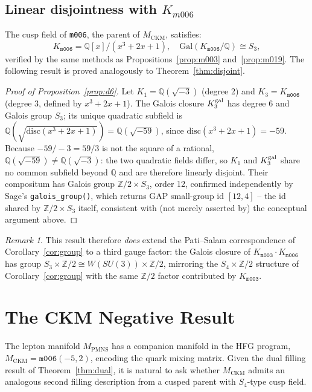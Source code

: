 \documentclass[11pt,a4paper]{article}
\theoremstyle{definition}
\theoremstyle{remark}
\newtheorem{remark}[theorem]{Remark}
\newcommand{\Z}{\mathbb{Z}}
\newcommand{\Q}{\mathbb{Q}}
\newcommand{\mfld}[1]{\texttt{#1}}
\newcommand{\Gal}{\mathrm{Gal}}
\newcommand{\disc}{\mathrm{disc}}
\begin{document}
\subsection{Linear disjointness with $K_{m006}$}

The cusp field of \mfld{m006}, the parent of $M_{\mathrm{CKM}}$,
satisfies:
\[
K_{\mfld{m006}} = \Q[x]/(x^3 + 2x + 1),\quad
\Gal(K_{\mfld{m006}}/\Q) \cong S_3,
\]
verified by the same methods as Propositions~\ref{prop:m003}
and~\ref{prop:m019}. The following result is proved analogously
to Theorem~\ref{thm:disjoint}.

\begin{proof}[Proof of Proposition~\ref{prop:d6}]
Let $K_1 = \Q(\sqrt{-3})$ (degree 2) and $K_3 = K_{\mfld{m006}}$
(degree 3, defined by $x^3+2x+1$). The Galois closure $K_3^{\rm
gal}$ has degree 6 and Galois group $S_3$; its unique quadratic
subfield is $\Q(\sqrt{\disc(x^3+2x+1)}) = \Q(\sqrt{-59})$, since
$\disc(x^3+2x+1)=-59$. Because $-59/-3=59/3$ is not the square of
a rational, $\Q(\sqrt{-59})\ne\Q(\sqrt{-3})$: the two quadratic
fields differ, so $K_1$ and $K_3^{\rm gal}$ share no common
subfield beyond $\Q$ and are therefore linearly disjoint. Their
compositum has Galois group $\Z/2\times S_3$, order 12, confirmed
independently by Sage's \texttt{galois\_group()}, which returns
GAP small-group id $[12,4]$ -- the id shared by $\Z/2\times S_3$
itself, consistent with (not merely asserted by) the conceptual
argument above.
\end{proof}

\begin{remark}
This result therefore \emph{does} extend the Pati--Salam correspondence of
Corollary~\ref{cor:group} to a third gauge factor: the Galois
closure of $K_{\mfld{m003}}\cdot K_{\mfld{m006}}$ has group
$S_3\times\Z/2\cong W(SU(3))\times\Z/2$, mirroring the
$S_4\times\Z/2$ structure of Corollary~\ref{cor:group} with the
same $\Z/2$ factor contributed by $K_{\mfld{m003}}$.
\end{remark}

\section{The CKM Negative Result}\label{sec:ckm-negative}

The lepton manifold $M_{\mathrm{PMNS}}$ has a companion manifold in
the HFG program, $M_{\mathrm{CKM}}=\mfld{m006}(-5,2)$, encoding the
quark mixing matrix. Given the dual filling result of
Theorem~\ref{thm:dual}, it is natural to ask whether
$M_{\mathrm{CKM}}$ admits an analogous second filling description
from a cusped parent with $S_4$-type cusp field.
\end{document}
